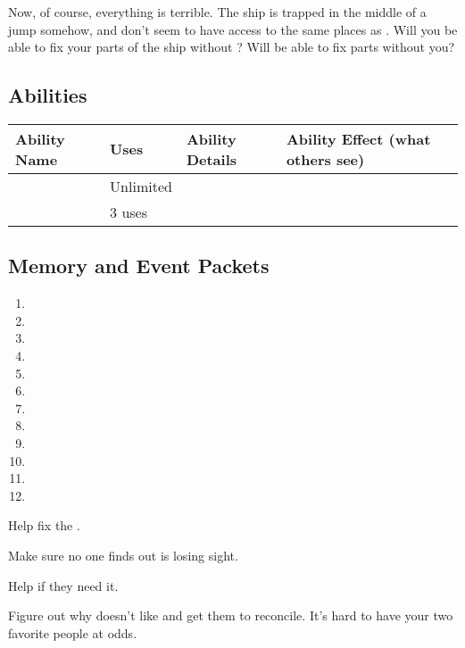 \documentclass[char]{TMFHope}
\begin{document}
Now, of course, everything is terrible. The ship is trapped in the middle of a jump somehow, and don't seem to have access to the same places as \cEng{}. Will you be able to fix your parts of the ship without \cEng{\them}? Will \cEng{\they} be able to fix \cEng{\their} parts without you?


\subsection*{Abilities}
\begin{tabular}{|p{2cm}|p{1.5cm}|p{9cm}|p{3.5cm}|} 
 \hline
 \textbf{Ability Name} & \textbf{Uses} & \textbf{Ability Details} & \textbf{Ability Effect (what others see)} \\ 
\hline 
 \aEngineering{\MYname} & Unlimited & \aEngineering{\MYtext} & \aEngineering{\MYeffect} \\ 
\hline
 \aNegotiation{\MYname} & 3 uses & \aNegotiation{\MYtext} & \aNegotiation{\MYeffect}\\ 
 \hline
\end{tabular}

\subsection*{Memory and Event Packets}
\begin{enumerate}
	\item \mPractice{\MYname}
	\item \mDHAlpha{\MYname}
	\item \mDeckHandOne{\MYname}
	\item \mRepairsTwo{\MYname}
	\item \mRepairsFour{\MYname}
	\item \mBroom{\MYname}
	\item \mLab{\MYname}
	\item \mPatient{\MYname}
	\item \mKitchen{\MYname}
	\item \mWeight{\MYname}
	\item \mTheater{\MYname}
	\item \mCrates{\MYname}
\end{enumerate}

\begin{itemz}[Goals]
	\item Help \cEng{} fix the \pNew{}.
	\item Make sure no one finds out \cEng{} is losing \cEng{\their} sight.
	\item Help \cNav{} if they need it.
	\item Figure out why \cEng{} doesn't like \cNav{} and get them to reconcile. It's hard to have your two favorite people at odds.
\end{itemz}
\end{document}
